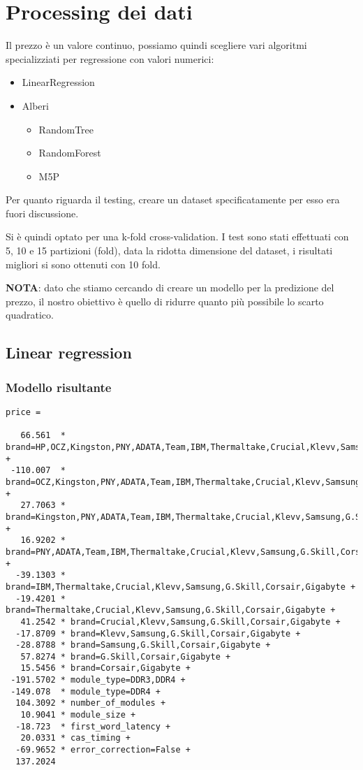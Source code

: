 \documentclass[12pt]{report}
\begin{document}
\newpage
\section{Processing dei dati}
Il prezzo è un valore continuo, possiamo quindi scegliere vari algoritmi specializziati per regressione con valori numerici:

\begin{itemize}
	\item LinearRegression
	\item Alberi
		\begin {itemize}
	\item RandomTree
	\item RandomForest
	\item M5P
\end{itemize}
\end{itemize}

Per quanto riguarda il testing, creare un dataset specificatamente per esso era fuori discussione.

Si è quindi optato per una k-fold cross-validation. I test sono stati effettuati con 5, 10 e 15
partizioni (fold), data la ridotta dimensione del dataset, i risultati migliori si sono ottenuti con 10 fold.

\textbf{NOTA}: dato che stiamo cercando di creare un modello per la predizione del prezzo, il nostro obiettivo
è quello di ridurre quanto più possibile lo scarto quadratico.

\newpage
\subsection{Linear regression}

\subsubsection{Modello risultante}
\begin{lstlisting}[breaklines=true]
price =

   66.561  * brand=HP,OCZ,Kingston,PNY,ADATA,Team,IBM,Thermaltake,Crucial,Klevv,Samsung,G.Skill,Corsair,Gigabyte +
 -110.007  * brand=OCZ,Kingston,PNY,ADATA,Team,IBM,Thermaltake,Crucial,Klevv,Samsung,G.Skill,Corsair,Gigabyte +
   27.7063 * brand=Kingston,PNY,ADATA,Team,IBM,Thermaltake,Crucial,Klevv,Samsung,G.Skill,Corsair,Gigabyte +
   16.9202 * brand=PNY,ADATA,Team,IBM,Thermaltake,Crucial,Klevv,Samsung,G.Skill,Corsair,Gigabyte +
  -39.1303 * brand=IBM,Thermaltake,Crucial,Klevv,Samsung,G.Skill,Corsair,Gigabyte +
  -19.4201 * brand=Thermaltake,Crucial,Klevv,Samsung,G.Skill,Corsair,Gigabyte +
   41.2542 * brand=Crucial,Klevv,Samsung,G.Skill,Corsair,Gigabyte +
  -17.8709 * brand=Klevv,Samsung,G.Skill,Corsair,Gigabyte +
  -28.8788 * brand=Samsung,G.Skill,Corsair,Gigabyte +
   57.8274 * brand=G.Skill,Corsair,Gigabyte +
   15.5456 * brand=Corsair,Gigabyte +
 -191.5702 * module_type=DDR3,DDR4 +
 -149.078  * module_type=DDR4 +
  104.3092 * number_of_modules +
   10.9041 * module_size +
  -18.723  * first_word_latency +
   20.0331 * cas_timing +
  -69.9652 * error_correction=False +
  137.2024
\end{lstlisting}
\end{document}
